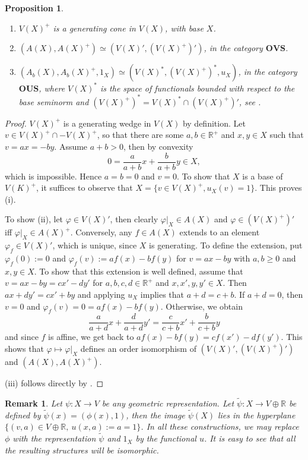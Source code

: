 \documentclass[12pt,letterpaper]{article}
\newtheorem{proposition}[lemma]{Proposition}
\newtheorem{remark}[lemma]{Remark}
\newcommand{\ct}[1]{\mathbf{#1}}
\begin{document}
\begin{proposition}\label{prop:XBN}
\begin{enumerate}
\item[(i)] $V(X)^+$ is a generating cone in $V(X)$, with base $X$.
\item[(ii)] $(A(X),A(X)^+)\simeq (V(X)',(V(X)^+)')$, in the category $\ct{OVS}$.
\item[(iii)] $(A_b(X),A_b(X)^+,1_X)\simeq (V(X)^*,(V(X)^+)^*,u_X)$, in the category $\ct{OUS}$, where $V(X)^*$ is the space of functionals bounded with respect to the base seminorm and $(V(X)^+)^*=V(X)^*\cap (V(X)^+)'$, see \cite{ovs}.
\end{enumerate}

\end{proposition}

\begin{proof} $V(X)^+$ is a generating wedge in $V(X)$ by definition. Let $v\in V(X)^+\cap -V(X)^+$, so that there are some $a,b\in \mathbb R^+$ and $x,y\in X$ such that 
$v=ax=-by$. Assume $a+b>0$, then by convexity 
\[
0=\frac a{a+b}x+\frac b{a+b}y\in X,
\]
 which is impossible. Hence $a=b=0$ and $v=0$. To show that $X$ is a base of $V(K)^+$, it suffices to observe that $X=\{v\in V(X)^+, u_X(v)=1\}$. This proves (i).

To show (ii), let $\varphi\in V(X)'$, then clearly $\varphi|_X\in A(X)$ and $\varphi\in (V(X)^+)'$ iff $\varphi|_X\in A(X)^+$. Conversely, any  $f\in A(X)$ extends to an element $\varphi_f\in V(X)'$, which is unique, since 
 $X$ is generating. To define the extension, put  $\varphi_f(0):=0$ and  $\varphi_f(v):=af(x)-bf(y)$ for  $v=ax-by$ with $a,b\ge 0$ and $x,y\in X$. 
 To show that this  extension is well defined, assume that $v=ax-by=cx'-dy'$ for $a,b,c,d\in \mathbb R^+$ and $x,x',y,y'\in X$. Then $ax+dy'=cx'+by$ and applying $u_X$ implies that $a+d=c+b$.
 If $a+d=0$, then $v=0$ and $\varphi_f(v)=0=af(x)-bf(y)$. Otherwise, we obtain 
 \[
\frac a{a+d}x+ \frac d{a+d}y'=\frac c{c+b} x'+\frac b{c+b} y
 \]
and since $f$ is affine, we get back to $af(x)-bf(y)=cf(x')-df(y')$. This shows that  $\varphi\mapsto \varphi|_X$ defines an order isomorphism of $(V(X)',(V(X)^+)')$ and 
$(A(X),A(X)^+)$.

(iii) follows directly by \cite[Theorem 2 (iii)]{ovs}.

\end{proof}

\begin{remark} Let $\psi:X\to V$ be  any geometric representation.  Let $\tilde \psi:X\to V\oplus \mathbb R$ be defined by $\tilde \psi(x)=(\phi(x),1)$, then the image 
$\tilde \psi(X)$ lies in the hyperplane $\{(v,a)\in V\oplus \mathbb R,\ u(x,a):=a=1\}$. In all these constructions, we may replace $\phi$ with the representation $\tilde \psi$ and $1_X$ by the functional $u$.  It is easy to see that all the resulting structures will be isomorphic.

\end{remark}
\end{document}
